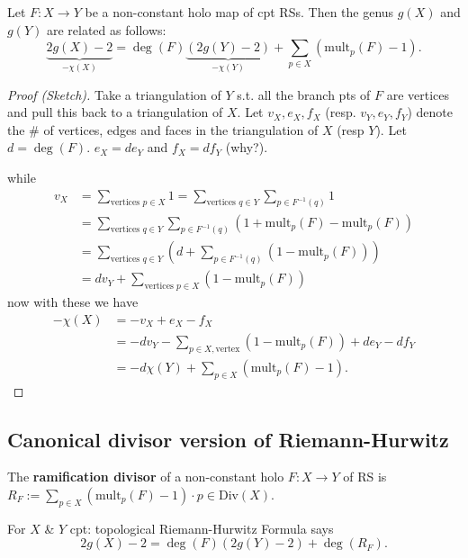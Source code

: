\documentclass{article}
\begin{document}
\begin{theorem}
    Let $F: X \to Y$ be a non-constant holo map of cpt RSs.
    Then the genus $g(X)$ and $g(Y)$ are related as follows:
    \[
    \underbrace{2g(X) - 2}_{-\chi(X)} = \deg(F) \underbrace{(2g(Y) - 2)}_{-\chi(Y)} + \sum_{p \in X} (\text{mult}_p(F) - 1).
    \]
\end{theorem}
\begin{proof}[Proof (Sketch)]
    Take a triangulation of $Y$ s.t. all the branch pts of $F$ are vertices and pull this back to a triangulation of $X$.
    Let $v_X, e_X, f_X$ (resp. $v_Y, e_Y, f_Y$) denote the \# of vertices, edges and faces in the triangulation of $X$ (resp $Y$).
    Let $d = \deg(F)$.
    $e_X = d e_Y$ and $f_X = d f_Y$ (why?).
    
    while
    \begin{align*}
        v_X &= \sum_{\text{vertices } p \in X} 1 = \sum_{\text{vertices } q \in Y} \sum_{p \in F^{-1}(q)} 1 \\
        &= \sum_{\text{vertices } q \in Y} \sum_{p \in F^{-1}(q)} (1 + \text{mult}_p(F) - \text{mult}_p(F)) \\
        &= \sum_{\text{vertices } q \in Y} (d + \sum_{p \in F^{-1}(q)} (1 - \text{mult}_p(F))) \\
        &= d v_Y + \sum_{\text{vertices } p \in X} (1 - \text{mult}_p(F))
    \end{align*}
    now with these we have
    \begin{align*}
        -\chi(X) &= -v_X + e_X - f_X \\
        &= -d v_Y - \sum_{p \in X, \text{vertex}} (1 - \text{mult}_p(F)) + d e_Y - d f_Y \\
        &= -d \chi(Y) + \sum_{p \in X} (\text{mult}_p(F) - 1).
    \end{align*}
\end{proof}

\subsection{Canonical divisor version of Riemann-Hurwitz}

\begin{definition}
    The \textbf{ramification divisor} of a non-constant holo $F: X \to Y$ of RS is $R_F := \sum_{p \in X} (\text{mult}_p(F) - 1) \cdot p \in \text{Div}(X)$.
\end{definition}

\begin{remark}
    For $X$ \& $Y$ cpt: topological Riemann-Hurwitz Formula says
    \[
    2g(X) - 2 = \deg(F) (2g(Y) - 2) + \deg(R_F).
    \]
\end{remark}
\end{document}
